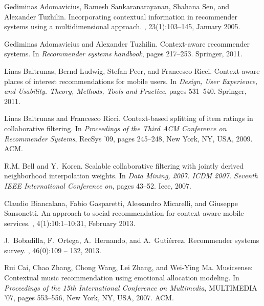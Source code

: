 \documentclass[preprint,12pt]{elsarticle}
\begin{document}
\begin{thebibliography}{10}

Gediminas Adomavicius, Ramesh Sankaranarayanan, Shahana Sen, and Alexander
  Tuzhilin.
\newblock Incorporating contextual information in recommender systems using a
  multidimensional approach.
, 23(1):103--145, January 2005.

Gediminas Adomavicius and Alexander Tuzhilin.
\newblock Context-aware recommender systems.
\newblock In {\em Recommender systems handbook}, pages 217--253. Springer,
  2011.

Linas Baltrunas, Bernd Ludwig, Stefan Peer, and Francesco Ricci.
\newblock Context-aware places of interest recommendations for mobile users.
\newblock In {\em Design, User Experience, and Usability. Theory, Methods,
  Tools and Practice}, pages 531--540. Springer, 2011.

Linas Baltrunas and Francesco Ricci.
\newblock Context-based splitting of item ratings in collaborative filtering.
\newblock In {\em Proceedings of the Third ACM Conference on Recommender
  Systems}, RecSys '09, pages 245--248, New York, NY, USA, 2009. ACM.

R.M. Bell and Y.~Koren.
\newblock Scalable collaborative filtering with jointly derived neighborhood
  interpolation weights.
\newblock In {\em Data Mining, 2007. ICDM 2007. Seventh IEEE International
  Conference on}, pages 43--52. Ieee, 2007.

Claudio Biancalana, Fabio Gasparetti, Alessandro Micarelli, and Giuseppe
  Sansonetti.
\newblock An approach to social recommendation for context-aware mobile
  services.
, 4(1):10:1--10:31, February
  2013.

J.~Bobadilla, F.~Ortega, A.~Hernando, and A.~Gutiérrez.
\newblock Recommender systems survey.
, 46(0):109 -- 132, 2013.

Rui Cai, Chao Zhang, Chong Wang, Lei Zhang, and Wei-Ying Ma.
\newblock Musicsense: Contextual music recommendation using emotional
  allocation modeling.
\newblock In {\em Proceedings of the 15th International Conference on
  Multimedia}, MULTIMEDIA '07, pages 553--556, New York, NY, USA, 2007. ACM.


\end{thebibliography}
\end{document}
